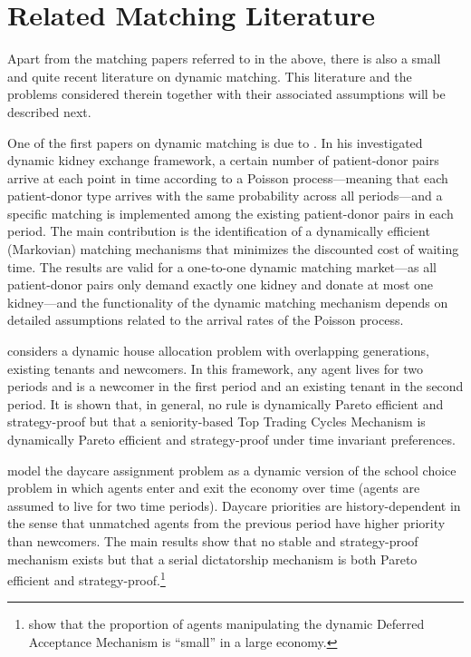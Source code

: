 \documentclass[12pt,fleqn]{article}
\begin{document}
\section{Related Matching Literature}\label{SEC:literature}
Apart from the matching papers referred to in the above, there is also a small and quite recent literature on dynamic matching. This literature and the problems considered therein together with their associated assumptions will be described next.

One of the first papers on dynamic matching is due to \citet{bib:Unver}. In his investigated dynamic kidney exchange framework, a certain number of patient-donor pairs arrive at each point in time according to a Poisson process---meaning that each patient-donor type arrives with the same probability across all periods---and a specific matching is implemented among the existing patient-donor pairs in each period. The main contribution is the identification of a dynamically efficient (Markovian) matching mechanisms that minimizes the discounted cost of waiting time. The results are valid for a one-to-one dynamic matching market---as all patient-donor pairs only demand exactly one kidney and donate at most one kidney---and the functionality of the dynamic matching mechanism depends on detailed assumptions related to the arrival rates of the Poisson process.

\citet{bib:Kurino} considers a dynamic house allocation problem with overlapping generations, existing tenants and newcomers. In this framework, any agent lives for two periods and is a newcomer in the first period and an existing tenant in the second period. It is shown that, in general, no rule is dynamically Pareto efficient and strategy-proof but that a seniority-based Top Trading Cycles Mechanism is dynamically Pareto efficient and strategy-proof under time invariant preferences.

\citet{bib:KennesEtAl2014} model the daycare assignment problem as a dynamic version of the school choice problem in which agents enter and exit the economy over time (agents are assumed to live for two time periods). Daycare priorities are history-dependent in the sense that unmatched agents from the previous period have higher priority than newcomers. The main results show that no stable and strategy-proof mechanism exists but that a serial dictatorship mechanism is both Pareto efficient and strategy-proof.\footnote{\citet{bib:KennesEtAl2015} show that the proportion of agents manipulating the dynamic Deferred Acceptance Mechanism is ``small'' in a large economy.}
\end{document}
